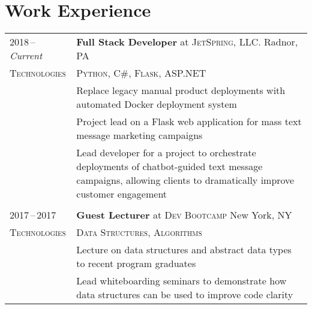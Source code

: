 \documentclass[a4paper,11pt]{article}
\begin{document}
\section{Work Experience}
\begin{tabularx}{\textwidth}{@{\extracolsep{2pt}}p{6em}|X@{}}
    2018\,--\,\emph{Current} & \textbf{Full Stack Developer} at \textsc{JetSpring, LLC.} \hfill Radnor, PA \\
    \textsc{Technologies}    & \textsc{Python}, \textsc{C\#}, \textsc{Flask}, \textsc{ASP.NET} \\
                             & \footnotesize Replace legacy manual product deployments with automated Docker deployment system \\
                             & \footnotesize Project lead on a Flask web application for mass text message marketing campaigns \\
                             & \footnotesize Lead developer for a project to orchestrate deployments of chatbot-guided text message campaigns, allowing clients to dramatically improve customer engagement \\
    \multicolumn{2}{c}{} \\

    2017\,--\,2017           & \textbf{Guest Lecturer} at \textsc{Dev Bootcamp} \hfill New York, NY \\
    \textsc{Technologies}    & \textsc{Data Structures}, \textsc{Algorithms} \\
                             & \footnotesize Lecture on data structures and abstract data types to recent program graduates \\
                             & \footnotesize Lead whiteboarding seminars to demonstrate how data structures can be used to improve code clarity \\
\end{tabularx}
\end{document}
